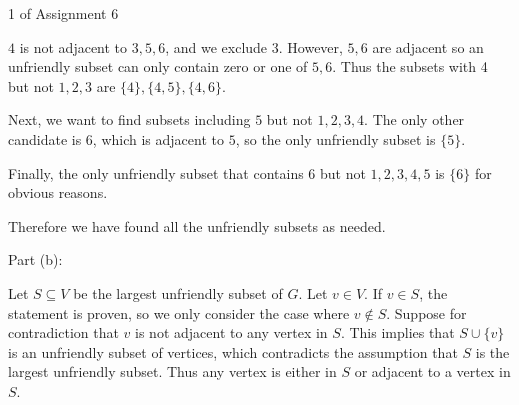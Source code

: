 \documentclass{eh-homework}
\begin{document}
\begin{question}{1 of Assignment 6}
        \smallskip

        \(4\) is not adjacent to \(3,5,6\), and we exclude \(3\). However, \(5,6\) are adjacent so an unfriendly subset can only contain zero or one of \(5,6\). Thus the subsets with 4 but not \(1,2,3\) are \(\{ 4 \}, \{ 4,5 \} , \{ 4,6 \}\).

        \smallskip

        Next, we want to find subsets including \(5\) but not \(1,2,3,4\). The only other candidate is \(6\), which is adjacent to \(5\), so the only unfriendly subset is \(\{ 5 \}\).

        \smallskip

        Finally, the only unfriendly subset that contains \(6\) but not \(1,2,3,4,5\) is \(\{ 6 \}\) for obvious reasons.

        Therefore we have found all the unfriendly subsets as needed.

        \medskip

        Part (b):

        Let \(S \subseteq V\) be the largest unfriendly subset of \(G\). Let \(v \in V\). If \(v \in S\), the statement is proven, so we only consider the case where \(v \notin S\). Suppose for contradiction that \(v\) is not adjacent to any vertex in \(S\). This implies that \(S \cup \{ v \}\) is an unfriendly subset of vertices, which contradicts the assumption that \(S\) is the largest unfriendly subset. Thus any vertex is either in \(S\) or adjacent to a vertex in \(S\).
    \end{question}
    \pagebreak
\end{document}
